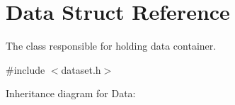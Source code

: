 \hypertarget{struct_data}{}\section{Data Struct Reference}
\label{struct_data}


The class responsible for holding data container.  




{\ttfamily \#include $<$dataset.\+h$>$}



Inheritance diagram for Data\+:
